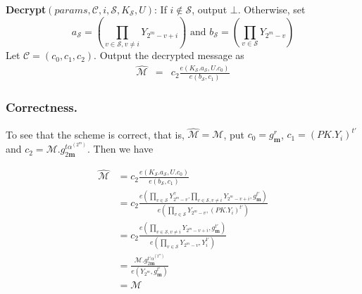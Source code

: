 \noindent\textbf{Decrypt}$(params,\mathcal{C},i,\mathcal{S},K_{\mathcal{S}},U)$: If $i\notin\mathcal{S}$, output $\bot$. Otherwise, set
\begin{equation}
a_{\mathcal{S}}=\left(\prod_{v\in\mathcal{S},v\neq i}Y_{2^m-v+i}\right) \text{ and } b_{\mathcal{S}}=\left(\prod_{v\in\mathcal{S}}Y_{2^m-v}\right)\nonumber
\end{equation}
Let $\mathcal{C}=(c_0,c_1,c_2)$. Output the decrypted message as  
\begin{eqnarray} 
\hat{\mathcal{M}}&=&c_2\frac{{e}(K_{\mathcal{S}}.a_{\mathcal{S}},U.c_0)}{{e}(b_{\mathcal{S}},c_1)} \nonumber
\end{eqnarray}

\subsubsection{Correctness.} To see that the scheme is correct, that is, $\hat{\mathcal{M}}=\mathcal{M}$, put $c_0=g^r_{\mathbf{m}}$, $c_1=(PK.Y_i)^{t'}$ and $c_2=\mathcal{M}.g^{t\alpha^{(2^m)}}_{2\mathbf{m}}$. Then we have

\begin{equation}
\begin{split}
 \hat{\mathcal{M}}&=c_2\frac{{e}(K_{\mathcal{S}}.a_{\mathcal{S}},U.c_0)}{{e}(b_{\mathcal{S}},c_1)}\\
 &=c_2\frac{e(\prod_{v\in\mathcal{S}}Y^{\gamma}_{2^m-v}.\prod_{v\in\mathcal{S},v\neq i}Y_{2^m-v+i},g^{t'}_{\mathbf{m}})}{e(\prod_{v\in\mathcal{S}}Y_{2^m-v},(PK.Y_i)^{t'})}\\
 &=c_2\frac{e(\prod_{v\in\mathcal{S},v\neq i}Y_{2^m-v+i},g^{t'}_{\mathbf{m}})}{e(\prod_{v\in\mathcal{S}}Y_{2^m-v},Y_i^{t'})}\\
 &=\frac{\mathcal{M}.g^{t'\alpha^{(2^m)}}_{2\mathbf{m}}}{e(Y_{2^m},g^{t'}_{\mathbf{m}})}\\
 &=\mathcal{M}\nonumber
\end{split} 
\end{equation}

